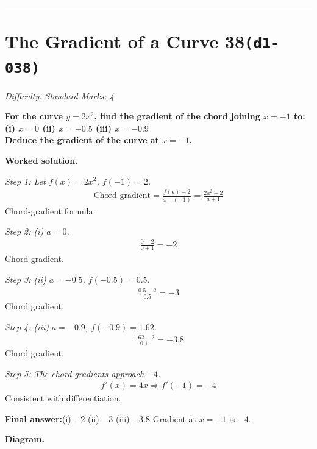 \documentclass[11pt]{article}
\newcommand{\question}[1]{\par\medskip\noindent\textbf{#1}\par}
\begin{document}
\medskip\hrule

\section*{The Gradient of a Curve 38\quad\small\texttt{(d1-038)}}
\textit{Difficulty: Standard \quad\textbar\quad Marks: 4}

\question{For the curve \( y = 2x^2 \), find the gradient of the chord joining \( x = -1 \) to:\\[3pt]  (i) \( x = 0 \) \quad  (ii) \( x = -0.5 \) \quad  (iii) \( x = -0.9 \)\\[3pt]  Deduce the gradient of the curve at \( x = -1 \).}

\textbf{Worked solution.}

\textit{Step 1: Let \( f(x) = 2x^2 \), \( f(-1) = 2 \).}
\[\begin{gathered}
\text{Chord gradient} = \frac{f(a) - 2}{a - (-1)} = \frac{2a^2 - 2}{a + 1}
\end{gathered}\]
Chord-gradient formula.

\textit{Step 2: (i) \( a = 0 \).}
\[\begin{gathered}
\frac{0 - 2}{0 + 1} = -2
\end{gathered}\]
Chord gradient.

\textit{Step 3: (ii) \( a = -0.5 \), \( f(-0.5) = 0.5 \).}
\[\begin{gathered}
\frac{0.5 - 2}{0.5} = -3
\end{gathered}\]
Chord gradient.

\textit{Step 4: (iii) \( a = -0.9 \), \( f(-0.9) = 1.62 \).}
\[\begin{gathered}
\frac{1.62 - 2}{0.1} = -3.8
\end{gathered}\]
Chord gradient.

\textit{Step 5: The chord gradients approach \( -4 \).}
\[\begin{gathered}
f'(x) = 4x \Rightarrow f'(-1) = -4
\end{gathered}\]
Consistent with differentiation.

\begin{answerbox}
\textbf{Final answer:}\quad (i) \(\displaystyle  -2 \) \quad  (ii) \(\displaystyle  -3 \) \quad  (iii) \(\displaystyle  -3.8 \) \quad  Gradient at \(\displaystyle  x = -1 \) is \(\displaystyle  -4 \).
\end{answerbox}
\textbf{Diagram.}
\end{document}
